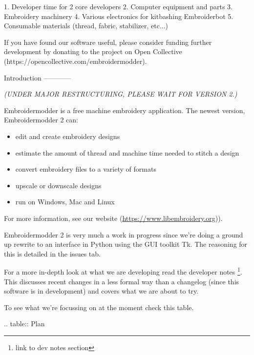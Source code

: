 \documentclass[a4paper]{report}
\begin{document}
1. Developer time for 2 core developers
2. Computer equipment and parts
3. Embroidery machinery
4. Various electronics for kitbashing Embroiderbot
5. Consumable materials (thread, fabric, stabilizer, etc...)

If you have found our software useful, please consider funding further
development by donating to the project on Open Collective
(https://opencollective.com/embroidermodder).

Introduction
------------

\emph{(UNDER MAJOR RESTRUCTURING, PLEASE WAIT FOR VERSION 2.)}

Embroidermodder is a free machine embroidery application.
The newest version, Embroidermodder 2 can:

\begin{itemize}
\item edit and create embroidery designs
\item estimate the amount of thread and machine time needed to stitch a design
\item convert embroidery files to a variety of formats
\item upscale or downscale designs
\item run on Windows, Mac and Linux
\end{itemize}

For more information, see our website (\url{https://www.libembroidery.org})).

Embroidermodder 2 is very much a work in progress since we're doing a ground up
rewrite to an interface in Python using the GUI toolkit Tk. The reasoning for
this is detailed in the issues tab.

For a more in-depth look at what we are developing read the developer notes
\footnote{link to dev notes section}. This discusses recent changes in a less
formal way than a changelog (since this software is in development) and covers
what we are about to try.

To see what we're focussing on at the moment check this table.

.. table:: Plan
\end{document}

